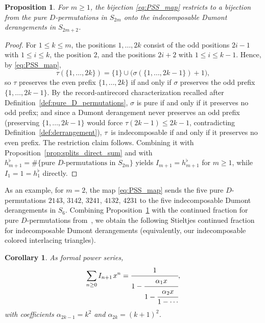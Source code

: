 \documentclass[10pt,a4paper]{amsart}
\numberwithin{equation}{section}
\newcommand{\ssp}{\hspace{1pt}}
\newtheorem{Corollary}[Theorem]{Corollary}
\newtheorem{Proposition}[Theorem]{Proposition}
\theoremstyle{definition}
\begin{document}
\begin{Proposition}\label{prop:pure_indecomposable_bijection}
	For $m\ge1$, the bijection \eqref{eq:PSS_map} restricts to a bijection
	from the pure $D$\nobreakdash-per\-mutations in $S_{2m}$ onto the indecomposable
	Dumont derangements in $S_{2m+2}$.
\end{Proposition}
\begin{proof}
	For $1\le k\le m$, the positions $1,\dots,2k$ consist of the odd
	positions $2i-1$ with $1\le i\le k$, the position $2$, and the
	positions $2i+2$ with $1\le i\le k-1$.
	Hence, by \eqref{eq:PSS_map},
	\begin{equation*}
		\tau(\{1,\dots,2k\})=\{1\}\cup
		\bigl(\sigma(\{1,\dots,2k-1\})+1\bigr),
	\end{equation*}
	so $\tau$ preserves the even prefix $\{1,\dots,2k\}$ if and only if
	$\sigma$ preserves the odd prefix $\{1,\dots,{2k-1}\}$.
	By the record-antirecord characterization recalled after
	Definition~\ref{def:pure_D_permutations}, $\sigma$ is pure if and only if it
	preserves no odd prefix; and since a Dumont derangement never preserves
	an odd prefix (preserving $\{1,\dots,2k-1\}$ would force
	$\tau(2k-1)\le 2k-1$, contradicting Definition~\ref{def:derrangement}), $\tau$~is indecomposable if and only if it preserves no even prefix.
	The restriction claim follows.
	Combining it with Proposition~\ref{prop:splits_direct_sum} and with
	$h^\flat_{m+1}=\#\{\text{pure $D$-permutations in }S_{2m}\}$
	\cite{DebSokal2024} yields $I_{m+1}=h^\flat_{m+1}$ for $m\ge1$, while
	$I_1=1=h^\flat_1$ directly.
\end{proof}

As an example, for $m=2$, the map \eqref{eq:PSS_map} sends the five pure
$D$-permutations $2143$, $3142$, $3241$, $4132$, $4231$ to the five
indecomposable Dumont derangements in $S_6$.
Combining Proposition~\ref{prop:pure_indecomposable_bijection} with the continued fraction for pure $D$-permutations from~\cite{DebSokal2024}, we obtain the following Stieltjes continued fraction for indecomposable Dumont derangements (equivalently, our indecomposable colored interlacing triangles).

\begin{Corollary}\label{cor:indecomposable_Sfrac} As formal power series,
\begin{equation*} \sum_{n\ge0}I_{n+1}\ssp x^n=\cfrac{1}{1-\cfrac{\alpha_1 x}{1-\cfrac{\alpha_2 x}{1-\cdots}}},
\end{equation*}
 with coefficients $\alpha_{2k-1}=k^2$
and $\alpha_{2k}=(k+1)^2$.
\end{Corollary}
\end{document}
